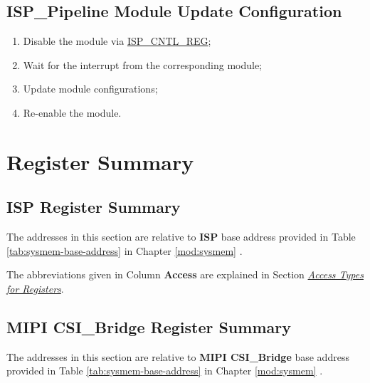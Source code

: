 \documentclass[main\_\_EN.tex]{subfiles}
\begin{document}
\subsection{ISP\_Pipeline Module Update Configuration}
\begin{enumerate}
    \item Disable the module via \hyperref[regdesc:ISPCNTLREG]{ISP\_CNTL\_REG};
    \item Wait for the interrupt from the corresponding module;
    \item Update module configurations;
    \item Re-enable the module.
\end{enumerate}




\newpage
\hypertarget{isp-reg-summ}{}
\section{Register Summary}
\label{sec:isp-reg-summ}

\subsection{ISP Register Summary}

The addresses in this section are relative to \textbf{ISP} base address provided in Table \ref{tab:sysmem-base-address} in Chapter \ref{mod:sysmem} \textit{}.

The abbreviations given in Column \textbf{Access} are explained in Section \hyperref[glossary-access-types]{\textit{Access Types for Registers}}.




\subsection{MIPI CSI\_Bridge Register Summary}

The addresses in this section are relative to \textbf{MIPI CSI\_Bridge} base address provided in Table \ref{tab:sysmem-base-address} in Chapter \ref{mod:sysmem} \textit{}.
\end{document}
